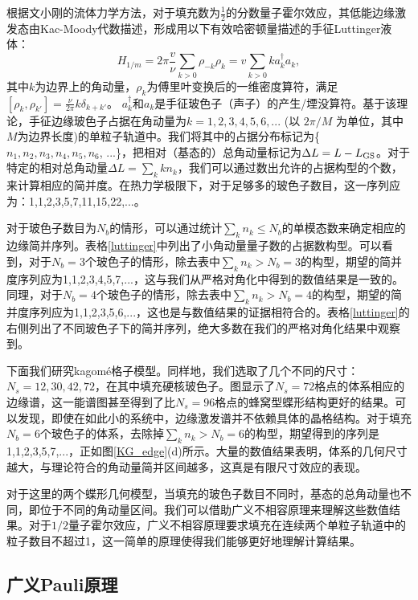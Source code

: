 根据文小刚的流体力学方法，对于填充数为$\frac{1}{2}$的分数量子霍尔效应，其低能边缘激发态由Kac-Moody代数描述，形成用以下有效哈密顿量描述的手征Luttinger液体：
\begin{equation}\label{eq:Wen}
   H_{1/m}=2\pi \frac{v}{\nu}\displaystyle\sum_{k>0}\rho_{-k}\rho_k=v\sum_{k>0} k a^{\dagger}_k a_k,
\end{equation}
其中$k$为边界上的角动量，$\rho_k$为傅里叶变换后的一维密度算符，满足$[\rho_k,\rho_{k'}]=\frac{\nu}{2\pi}k\delta_{k+k'}$。 $a^{\dagger}_k$和$a_k$是手征玻色子（声子）的产生/堙没算符。基于该理论，手征边缘玻色子占据在角动量为$k=1, 2, 3, 4, 5, 6, ...$ (以 $2\pi/M$ 为单位，其中$M$为边界长度)的单粒子轨道中。我们将其中的占据分布标记为\{$n_1,n_2,n_3,n_4,n_5,n_6$, ...\}，把相对（基态的）总角动量标记为$\Delta L = L - L_{\rm GS}$。对于特定的相对总角动量$\Delta L = \sum_{k} kn_{k}$，我们可以通过数出允许的占据构型的个数，来计算相应的简并度。在热力学极限下，对于足够多的玻色子数目，这一序列应为：1,1,2,3,5,7,11,15,22,...。

对于玻色子数目为$N_b$的情形，可以通过统计$\sum_k n_k\le N_b$的单模态数来确定相应的边缘简并序列。表格\ref{luttinger}中列出了小角动量量子数的占据数构型。可以看到，对于$N_b=3$个玻色子的情形，除去表中$\sum_k n_k>N_b=3$的构型，期望的简并度序列应为1,1,2,3,4,5,7,...，这与我们从严格对角化中得到的数值结果是一致的。同理，对于$N_b=4$个玻色子的情形，除去表中$\sum_k n_k>N_b=4$的构型，期望的简并度序列应为1,1,2,3,5,6,...，这也是与数值结果的证据相符合的。表格\ref{luttinger}的右侧列出了不同玻色子下的简并序列，绝大多数在我们的严格对角化结果中观察到。

下面我们研究kagom\'{e}格子模型。同样地，我们选取了几个不同的尺寸：$N_s =12, 30, 42, 72$，在其中填充硬核玻色子。图显示了$N_s=72$格点的体系相应的边缘谱，这一能谱图甚至得到了比$N_s=96$格点的蜂窝型蝶形结构更好的结果。可以发现，即使在如此小的系统中，边缘激发谱并不依赖具体的晶格结构。对于填充$N_b=6$个玻色子的体系，去除掉$\sum_k n_k > N_b=6$的构型，期望得到的序列是1,1,2,3,5,7,...，正如图\ref{KG_edge}(d)所示。大量的数值结果表明，体系的几何尺寸越大，与理论符合的角动量简并区间越多，这真是有限尺寸效应的表现。

对于这里的两个蝶形几何模型，当填充的玻色子数目不同时，基态的总角动量也不同，即位于不同的角动量区间。我们可以借助广义不相容原理来理解这些数值结果。对于$1/2$量子霍尔效应，广义不相容原理要求填充在连续两个单粒子轨道中的粒子数目不超过1，这一简单的原理使得我们能够更好地理解计算结果。


\subsection{广义Pauli原理}
